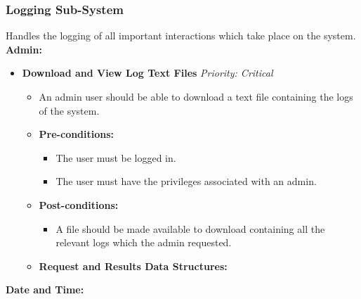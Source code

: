 \documentclass{article}
\begin{document}
				\subsubsection{Logging Sub-System}\label{subsubsec:logging}
				Handles the logging of all important interactions which take place on the system.\\
				[3mm]
				\textbf{Admin:}
				\begin{itemize}
					\item \textbf{Download and View Log Text Files} \hfill \textit{Priority: Critical}
					\begin{itemize}
						\item An admin user should be able to download a text file containing the logs of the system.
						\item \textbf{Pre-conditions:}
						\begin{itemize}
							\item The user must be logged in.
							\item The user must have the privileges associated with an admin.
						\end{itemize}
						\item \textbf{Post-conditions:}
						\begin{itemize}
							\item A file should be made available to download containing all the relevant logs which the admin requested.
						\end{itemize}
						\item \textbf{Request and Results Data Structures:}
					\end{itemize}
				\end{itemize}
				\textbf{Date and Time:}
\end{document}

